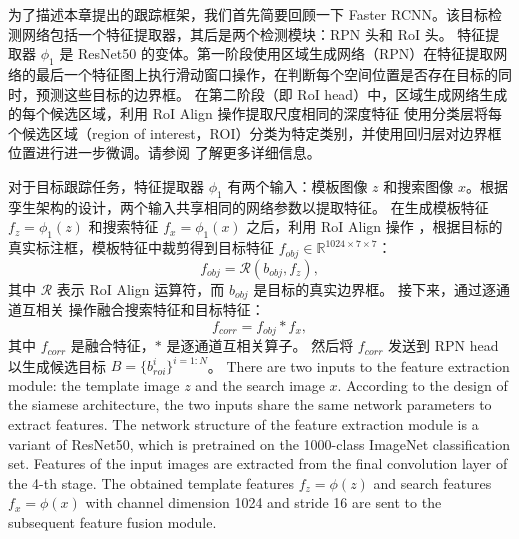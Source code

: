 
为了描述本章提出的跟踪框架，我们首先简要回顾一下 Faster RCNN。该目标检测网络包括一个特征提取器，其后是两个检测模块：RPN 头和 RoI 头。
特征提取器 $\phi_{1}$ 是 ResNet50 的变体。第一阶段使用区域生成网络（RPN）在特征提取网络的最后一个特征图上执行滑动窗口操作，在判断每个空间位置是否存在目标的同时，预测这些目标的边界框。
在第二阶段（即 RoI head）中，区域生成网络生成的每个候选区域，利用 RoI Align \cite{He2018MaskR} 操作提取尺度相同的深度特征
使用分类层将每个候选区域（region of interest，ROI）分类为特定类别，并使用回归层对边界框位置进行进一步微调。请参阅 \cite{ren2015faster} 了解更多详细信息。

对于目标跟踪任务，特征提取器 $\phi_{1}$ 有两个输入：模板图像 $z$ 和搜索图像 $x$。根据孪生架构的设计，两个输入共享相同的网络参数以提取特征。
在生成模板特征 $f_{z} = \phi_{1}(z)$ 和搜索特征 $f_{x} = \phi_{1}(x)$ 之后，利用 RoI Align 操作 \cite{He2018MaskR}，根据目标的真实标注框，模板特征中裁剪得到目标特征 $f_{obj} \in \mathbb{R}^{1024 \times 7 \times 7}$：
\begin{equation}
    f_{obj} = \mathcal{R}(b_{obj}, f_{z}),
\end{equation}
其中 $\mathcal{R}$ 表示 RoI Align 运算符，而 $b_{obj}$ 是目标的真实边界框。
接下来，通过逐通道互相关 \cite{SiamRPN++} 操作融合搜索特征和目标特征：
\begin{equation}
    f_{corr} = f_{obj} * f_{x},
\end{equation}
其中 $f_{corr}$ 是融合特征，$*$ 是逐通道互相关算子。
然后将 $f_{corr}$ 发送到 RPN head 以生成候选目标 $B=\{b^{i}_{roi}\}^{i=1:N}$。
\iffalse
There are two inputs to the feature extraction module: the template image $z$ and the search image $x$. According to the design of the siamese architecture, the two inputs share the same network parameters to extract features.
The network structure of the feature extraction module is a variant of ResNet50, which is pretrained on the 1000-class ImageNet classification set. Features of the input images are extracted from the final convolution layer of the 4-th stage. The obtained template features $f_{z} = \phi(z)$ and search features $f_{x} = \phi(x)$ with channel dimension 1024 and stride 16 are sent to the subsequent feature fusion module.

